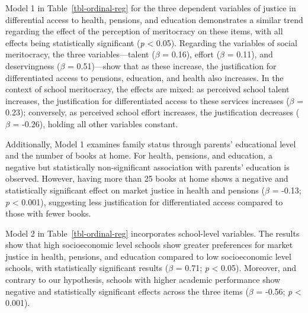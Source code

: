 \documentclass[
  12pt,
  letterpaper,
]{article}
\begin{document}
Model 1 in Table~\ref{tbl-ordinal-reg} for the three dependent variables
of justice in differential access to health, pensions, and education
demonstrates a similar trend regarding the effect of the perception of
meritocracy on these items, with all effects being statistically
significant (\emph{p} \textless{} 0.05). Regarding the variables of
social meritocracy, the three variables---talent (\(\beta\) = 0.16),
effort (\(\beta\) = 0.11), and deservingness (\(\beta\) = 0.51)---show
that as these increase, the justification for differentiated access to
pensions, education, and health also increases. In the context of school
meritocracy, the effects are mixed: as perceived school talent
increases, the justification for differentiated access to these services
increases (\(\beta\) = 0.23); conversely, as perceived school effort
increases, the justification decreases (\(\beta\) = -0.26), holding all
other variables constant.

Additionally, Model 1 examines family status through parents'
educational level and the number of books at home. For health, pensions,
and education, a negative but statistically non-significant association
with parents' education is observed. However, having more than 25 books
at home shows a negative and statistically significant effect on market
justice in health and pensions (\(\beta\) = -0.13; \emph{p} \textless{}
0.001), suggesting less justification for differentiated access compared
to those with fewer books.

Model 2 in Table~\ref{tbl-ordinal-reg} incorporates school-level
variables. The results show that high socioeconomic level schools show
greater preferences for market justice in health, pensions, and
education compared to low socioeconomic level schools, with
statistically significant results (\(\beta\) = 0.71; \emph{p}
\textless{} 0.05). Moreover, and contrary to our hypothesis, schools
with higher academic performance show negative and statistically
significant effects across the three items (\(\beta\) = -0.56; \emph{p}
\textless{} 0.001).
\end{document}
